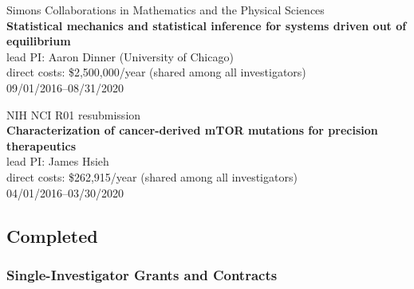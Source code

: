 \documentclass[10pt]{article}
\begin{document}
\vspace{2ex}

Simons Collaborations in Mathematics and the Physical Sciences\\
{\bf Statistical mechanics and statistical inference for systems driven out of equilibrium}\\
lead PI: Aaron Dinner (University of Chicago)\\
direct costs: \$2,500,000/year (shared among all investigators)\\
09/01/2016--08/31/2020

\vspace{2ex}


NIH NCI R01 resubmission\\
{\bf Characterization of cancer-derived mTOR mutations for precision therapeutics}\\
lead PI: James Hsieh\\
direct costs: \$262,915/year (shared among all investigators)\\
04/01/2016--03/30/2020

%


\eject
\subsection*{Completed}

\subsubsection*{Single-Investigator Grants and Contracts}
\end{document}
